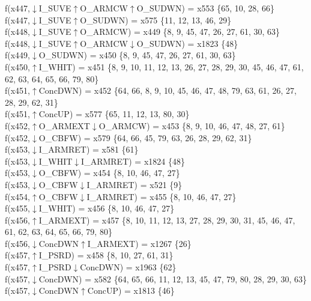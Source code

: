 f(x447,$\downarrow$I\_SUVE$\uparrow$O\_ARMCW$\uparrow$O\_SUDWN) = x553 \{65, 10, 28, 66\} \\  
f(x447,$\downarrow$I\_SUVE$\uparrow$O\_SUDWN) = x575 \{11, 12, 13, 46, 29\} \\  
f(x448,$\downarrow$I\_SUVE$\uparrow$O\_ARMCW) = x449 \{8, 9, 45, 47, 26, 27, 61, 30, 63\} \\  
f(x448,$\downarrow$I\_SUVE$\uparrow$O\_ARMCW$\downarrow$O\_SUDWN) = x1823 \{48\} \\  
f(x449,$\downarrow$O\_SUDWN) = x450 \{8, 9, 45, 47, 26, 27, 61, 30, 63\} \\  
f(x450,$\uparrow$I\_WHIT) = x451 \{8, 9, 10, 11, 12, 13, 26, 27, 28, 29, 30, 45, 46, 47, 61, 62, 63, 64, 65, 66, 79, 80\} \\  
f(x451,$\uparrow$ConcDWN) = x452 \{64, 66, 8, 9, 10, 45, 46, 47, 48, 79, 63, 61, 26, 27, 28, 29, 62, 31\} \\  
f(x451,$\uparrow$ConcUP) = x577 \{65, 11, 12, 13, 80, 30\} \\  
f(x452,$\uparrow$O\_ARMEXT$\downarrow$O\_ARMCW) = x453 \{8, 9, 10, 46, 47, 48, 27, 61\} \\  
f(x452,$\downarrow$O\_CBFW) = x579 \{64, 66, 45, 79, 63, 26, 28, 29, 62, 31\} \\  
f(x453,$\downarrow$I\_ARMRET) = x581 \{61\} \\  
f(x453,$\downarrow$I\_WHIT$\downarrow$I\_ARMRET) = x1824 \{48\} \\  
f(x453,$\downarrow$O\_CBFW) = x454 \{8, 10, 46, 47, 27\} \\  
f(x453,$\downarrow$O\_CBFW$\downarrow$I\_ARMRET) = x521 \{9\} \\  
f(x454,$\uparrow$O\_CBFW$\downarrow$I\_ARMRET) = x455 \{8, 10, 46, 47, 27\} \\  
f(x455,$\downarrow$I\_WHIT) = x456 \{8, 10, 46, 47, 27\} \\  
f(x456,$\uparrow$I\_ARMEXT) = x457 \{8, 10, 11, 12, 13, 27, 28, 29, 30, 31, 45, 46, 47, 61, 62, 63, 64, 65, 66, 79, 80\} \\  
f(x456,$\downarrow$ConcDWN$\uparrow$I\_ARMEXT) = x1267 \{26\} \\  
f(x457,$\uparrow$I\_PSRD) = x458 \{8, 10, 27, 61, 31\} \\  
f(x457,$\uparrow$I\_PSRD$\downarrow$ConcDWN) = x1963 \{62\} \\  
f(x457,$\downarrow$ConcDWN) = x582 \{64, 65, 66, 11, 12, 13, 45, 47, 79, 80, 28, 29, 30, 63\} \\  
f(x457,$\downarrow$ConcDWN$\uparrow$ConcUP) = x1813 \{46\} \\  
